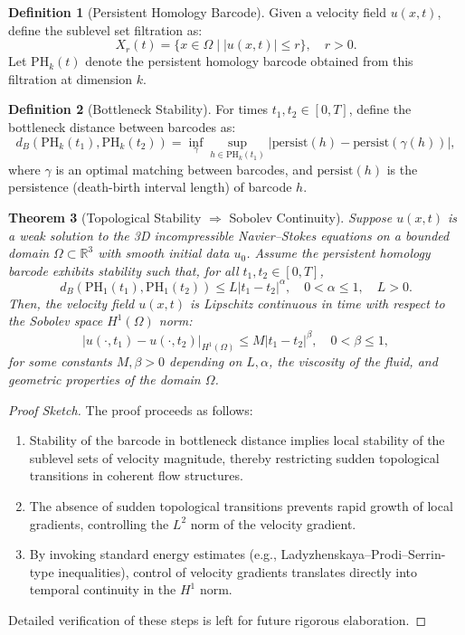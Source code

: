 \documentclass[11pt]{article}
\newtheorem{theorem}{Theorem}[section]
\theoremstyle{definition}
\newtheorem{definition}[theorem]{Definition}
\begin{document}
\begin{definition}[Persistent Homology Barcode]
Given a velocity field $u(x,t)$, define the sublevel set filtration as:
\[
X_r(t) = \{x \in \Omega \mid |u(x,t)| \leq r \}, \quad r > 0.
\]
Let $\mathrm{PH}_k(t)$ denote the persistent homology barcode obtained from this filtration at dimension $k$.
\end{definition}

\begin{definition}[Bottleneck Stability]
For times $t_1, t_2 \in [0,T]$, define the bottleneck distance between barcodes as:
\[
d_B(\mathrm{PH}_k(t_1), \mathrm{PH}_k(t_2)) = \inf_{\gamma} \sup_{h \in \mathrm{PH}_k(t_1)}|\mathrm{persist}(h)-\mathrm{persist}(\gamma(h))|,
\]
where $\gamma$ is an optimal matching between barcodes, and $\mathrm{persist}(h)$ is the persistence (death-birth interval length) of barcode $h$.
\end{definition}

\begin{theorem}[Topological Stability $\Rightarrow$ Sobolev Continuity]
\label{thm:topological_sobolev_continuity}
Suppose $u(x,t)$ is a weak solution to the 3D incompressible Navier--Stokes equations on a bounded domain $\Omega \subset \mathbb{R}^3$ with smooth initial data $u_0$. Assume the persistent homology barcode exhibits stability such that, for all $t_1,t_2\in[0,T]$,
\[
d_B(\mathrm{PH}_1(t_1), \mathrm{PH}_1(t_2)) \leq L|t_1-t_2|^{\alpha}, \quad 0 < \alpha \leq 1, \quad L > 0.
\]
Then, the velocity field $u(x,t)$ is Lipschitz continuous in time with respect to the Sobolev space $H^1(\Omega)$ norm:
\[
|u(\cdot,t_1)-u(\cdot,t_2)|_{H^1(\Omega)} \leq M|t_1-t_2|^{\beta}, \quad 0<\beta\leq 1,
\]
for some constants $M,\beta>0$ depending on $L,\alpha$, the viscosity of the fluid, and geometric properties of the domain $\Omega$.
\end{theorem}

\begin{proof}[Proof Sketch]
The proof proceeds as follows:
\begin{enumerate}
    \item Stability of the barcode in bottleneck distance implies local stability of the sublevel sets of velocity magnitude, thereby restricting sudden topological transitions in coherent flow structures.
    \item The absence of sudden topological transitions prevents rapid growth of local gradients, controlling the $L^2$ norm of the velocity gradient.
    \item By invoking standard energy estimates (e.g., Ladyzhenskaya–Prodi–Serrin-type inequalities), control of velocity gradients translates directly into temporal continuity in the $H^1$ norm.
\end{enumerate}
Detailed verification of these steps is left for future rigorous elaboration.
\end{proof}
\end{document}

